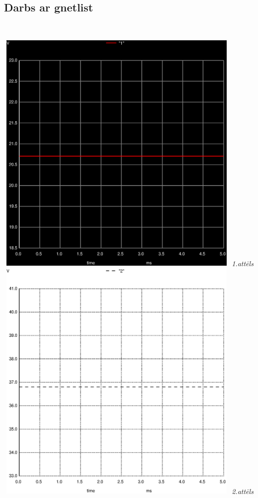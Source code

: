 \documentclass {report}
\begin{document}
\subsection{Darbs ar gnetlist}
 \\
\begin{center}
    \includegraphics[width=12cm,height=12cm,keepaspectratio]{011.ps} \textit{1.attēls} \\
    \includegraphics[width=12cm,height=12cm,keepaspectratio]{022.ps} \textit{2.attēls} \\
\end{center}
\end{document}

